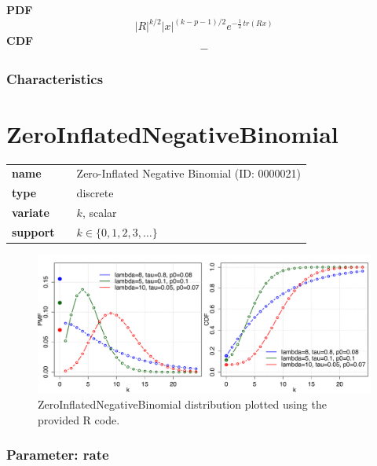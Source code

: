 \smallskip \noindent \hspace{.2cm} \textbf{PDF} 
\begin{equation*}|R|^{k/2}|x|^{(k-p-1)/2}e^{-\frac{1}2\,tr(Rx)}\end{equation*}
\smallskip \noindent \hspace{.2cm} \textbf{CDF} 
\begin{equation*}-\end{equation*}
\smallskip
\subsubsection*{Characteristics}
\smallskip
\section*{ZeroInflatedNegativeBinomial} 

  \bigskip 

\begin{tabular}{p{2cm}cl}
\textbf{name} & & Zero-Inflated Negative Binomial (ID: 0000021)\\ 
 
\textbf{type} & & discrete \\ 

\textbf{variate} & & $k$, scalar \\ 

\textbf{support} & & $k \in \{0,1,2,3,\dots\}$
\end{tabular}

\begin{figure}[ht!]
\centering
  \includegraphics[width=140mm]{pics/ZeroInflatedNegativeBinomial.pdf}
 \caption{ZeroInflatedNegativeBinomial distribution plotted using the provided R code.}
 \label{fig:ZeroInflatedNegativeBinomial}
\end{figure}

\subsubsection*{Parameter: rate}

